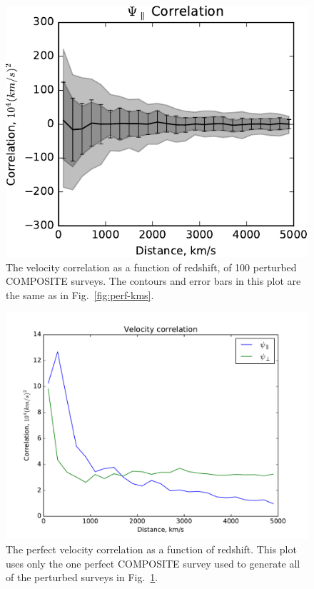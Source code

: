 \documentclass[usenatbib]{mn2e}
\begin{document}
\begin{figure}
  \begin{center}
  \includegraphics[scale=0.75]{psipar-pert-0,2-comp29-kms.pdf}
  \end{center}
\caption{\small
The velocity correlation as a function of redshift, of 100 perturbed COMPOSITE surveys. The contours and error bars in this plot are the same as in Fig.~\ref{fig:perf-kms}.
}
\label{fig:imperf-kms}
\end{figure}
\begin{figure}
  \begin{center}
  \includegraphics[scale=0.4]{single-vcorr-composite1.pdf}
  \end{center}
\caption{\small
The perfect velocity correlation as a function of redshift. This plot uses only the one perfect COMPOSITE survey used to generate all of the perturbed surveys in Fig.~\ref{fig:imperf-kms}.
}
\label{fig:single}
\end{figure}
\end{document}
